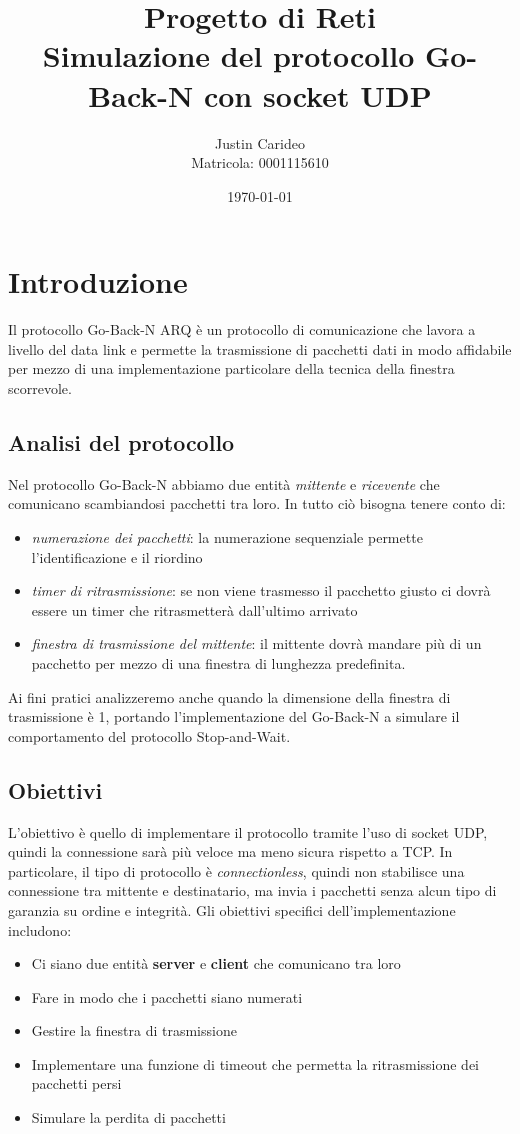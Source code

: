 \documentclass[a4paper,12pt]{report}
\title{Progetto di Reti\\ \textbf{Simulazione del protocollo Go-Back-N con socket UDP}}
\author{Justin Carideo\\ Matricola: 0001115610}
\date{\today}
\begin{document}
\maketitle

\newpage

\tableofcontents

\chapter{Introduzione}
Il protocollo Go-Back-N ARQ è un protocollo di comunicazione che lavora a livello del data link e permette 
la trasmissione di pacchetti dati in modo affidabile per mezzo di una 
implementazione particolare della tecnica della finestra scorrevole. 

\section{Analisi del protocollo}
Nel protocollo Go-Back-N abbiamo due entità \textit{mittente} e \textit{ricevente}
che comunicano scambiandosi pacchetti tra loro. In tutto ciò bisogna tenere
conto di:
\begin{itemize}
  \item \textit{numerazione dei pacchetti}: la numerazione sequenziale permette l'identificazione e il riordino
  \item \textit{timer di ritrasmissione}: se non viene trasmesso il pacchetto giusto ci dovrà essere un timer che ritrasmetterà dall'ultimo arrivato
  \item \textit{finestra di trasmissione del mittente}: il mittente dovrà mandare più di un pacchetto per mezzo di una finestra di lunghezza predefinita.
\end{itemize}
Ai fini pratici analizzeremo anche quando la dimensione della finestra di trasmissione è 1,
portando l'implementazione del Go-Back-N a simulare il comportamento del protocollo Stop-and-Wait.

\section{Obiettivi}
L'obiettivo è quello di implementare il protocollo tramite l'uso
di socket UDP, quindi la connessione sarà più veloce ma meno sicura rispetto
a TCP. In particolare, il tipo di protocollo è \textit{connectionless},
quindi non stabilisce una connessione tra mittente e destinatario, ma invia i pacchetti
senza alcun tipo di garanzia su ordine e integrità.
\newline
Gli obiettivi specifici dell’implementazione includono:
\begin{itemize}
  \item Ci siano due entità \textbf{server} e \textbf{client} che comunicano tra loro
  \item Fare in modo che i pacchetti siano numerati
  \item Gestire la finestra di trasmissione
  \item Implementare una funzione di timeout che permetta la ritrasmissione dei pacchetti persi
  \item Simulare la perdita di pacchetti
\end{itemize}
\end{document}
